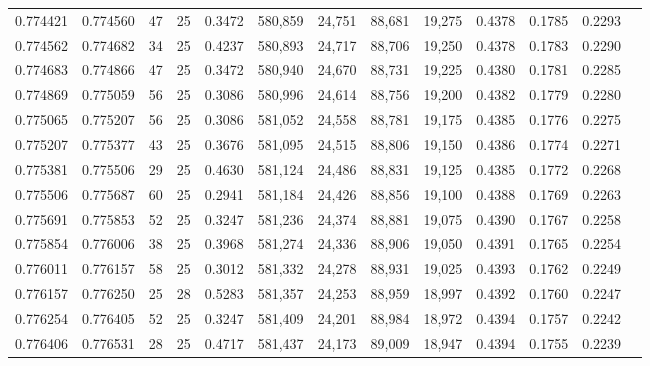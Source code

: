 \begin{tabular}{rrrrrrrrrrrrr}
0.774421 & 0.774560 &    47 &  25 &                                     0.3472 & 580,859 &  24,751 &  88,681 &  19,275 & 0.4378 & 0.1785 & 0.2293 \\
0.774562 & 0.774682 &    34 &  25 &                                     0.4237 & 580,893 &  24,717 &  88,706 &  19,250 & 0.4378 & 0.1783 & 0.2290 \\
0.774683 & 0.774866 &    47 &  25 &                                     0.3472 & 580,940 &  24,670 &  88,731 &  19,225 & 0.4380 & 0.1781 & 0.2285 \\
0.774869 & 0.775059 &    56 &  25 &                                     0.3086 & 580,996 &  24,614 &  88,756 &  19,200 & 0.4382 & 0.1779 & 0.2280 \\
0.775065 & 0.775207 &    56 &  25 &                                     0.3086 & 581,052 &  24,558 &  88,781 &  19,175 & 0.4385 & 0.1776 & 0.2275 \\
0.775207 & 0.775377 &    43 &  25 &                                     0.3676 & 581,095 &  24,515 &  88,806 &  19,150 & 0.4386 & 0.1774 & 0.2271 \\
0.775381 & 0.775506 &    29 &  25 &                                     0.4630 & 581,124 &  24,486 &  88,831 &  19,125 & 0.4385 & 0.1772 & 0.2268 \\
0.775506 & 0.775687 &    60 &  25 &                                     0.2941 & 581,184 &  24,426 &  88,856 &  19,100 & 0.4388 & 0.1769 & 0.2263 \\
0.775691 & 0.775853 &    52 &  25 &                                     0.3247 & 581,236 &  24,374 &  88,881 &  19,075 & 0.4390 & 0.1767 & 0.2258 \\
0.775854 & 0.776006 &    38 &  25 &                                     0.3968 & 581,274 &  24,336 &  88,906 &  19,050 & 0.4391 & 0.1765 & 0.2254 \\
0.776011 & 0.776157 &    58 &  25 &                                     0.3012 & 581,332 &  24,278 &  88,931 &  19,025 & 0.4393 & 0.1762 & 0.2249 \\
0.776157 & 0.776250 &    25 &  28 &                                     0.5283 & 581,357 &  24,253 &  88,959 &  18,997 & 0.4392 & 0.1760 & 0.2247 \\
0.776254 & 0.776405 &    52 &  25 &                                     0.3247 & 581,409 &  24,201 &  88,984 &  18,972 & 0.4394 & 0.1757 & 0.2242 \\
0.776406 & 0.776531 &    28 &  25 &                                     0.4717 & 581,437 &  24,173 &  89,009 &  18,947 & 0.4394 & 0.1755 & 0.2239 \\

\end{tabular}

